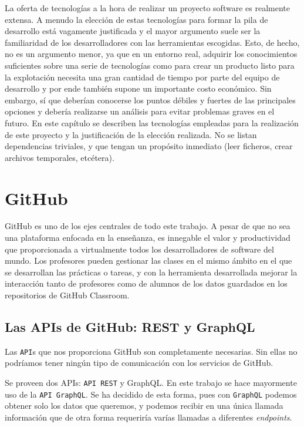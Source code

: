 La oferta de tecnologías a la hora de realizar un proyecto software es realmente extensa. A menudo la elección de estas tecnologías para formar la pila de desarrollo está vagamente justificada y el mayor argumento suele ser la familiaridad de los desarrolladores con las herramientas escogidas. Esto, de hecho, no es un argumento menor, ya que en un entorno real, adquirir los conocimientos suficientes sobre una serie de tecnologías como para crear un producto listo para la explotación necesita una gran cantidad de tiempo por parte del equipo de desarrollo y por ende también supone un importante costo económico. Sin embargo, sí que deberían conocerse los puntos débiles y fuertes de las principales opciones y debería realizarse un análisis para evitar problemas graves en el futuro. En este capítulo se describen las tecnologías empleadas para la realización de este proyecto y la justificación de la elección realizada. No se listan dependencias triviales, y que tengan un propósito inmediato (leer ficheros, crear archivos temporales, etcétera).


\section{GitHub}
GitHub es uno de los ejes centrales de todo este trabajo. A pesar de que no sea una plataforma enfocada en la enseñanza, es innegable el valor y productividad que proporcionada a virtualmente todos los desarrolladores de software del mundo. Los profesores pueden gestionar las clases en el mismo ámbito en el que se desarrollan las prácticas o tareas, y con la herramienta desarrollada mejorar la interacción tanto de profesores como de alumnos de los datos guardados en los repositorios de GitHub Classroom.

\subsection{Las APIs de GitHub: REST y  GraphQL}
Las \verb|API|s que nos proporciona GitHub son completamente necesarias. Sin ellas no podríamos tener ningún tipo de comunicación con los servicios de GitHub.

Se proveen dos APIs: \verb|API REST|\cite{github-rest-api} y GraphQL\cite{github-graphql}. En este trabajo se hace mayormente uso de la \verb|API GraphQL|. Se ha decidido de esta forma, pues con \verb|GraphQL| podemos obtener solo los datos que queremos, y podemos recibir en una única llamada información que de otra forma requeriría varías llamadas a diferentes \emph{endpoints}.

